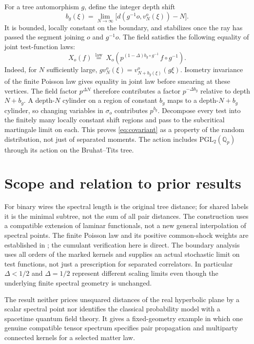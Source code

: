 \documentclass[11pt]{article}
\theoremstyle{remark}
\newcommand{\Qp}{\mathbb Q_p}
\begin{document}
For a tree automorphism \(g\), define the integer depth shift
\[
 b_g(\xi)=\lim_{N\to\infty}
   \bigl[d(g^{-1}o,v^o_N(\xi))-N\bigr] .
\]
It is bounded, locally constant on the boundary, and stabilizes once the ray has passed the segment joining \(o\) and \(g^{-1}o\). The field satisfies the following equality of joint test-function laws:
\begin{equation}\label{eq:covariant}
 X_o(f)\ \overset{\mathrm{law}}{=}\ 
 X_o\!\left(
     p^{(1-\Delta)b_g\circ g^{-1}}\, f\circ g^{-1}
      \right).
\end{equation}
Indeed, for \(N\) sufficiently large,
\(g v^o_N(\xi)=v^o_{N+b_g(\xi)}(g\xi)\).
Isometry invariance of the finite Poisson law gives equality in joint law before smearing at these vertices. The field factor \(p^{\Delta N}\) therefore contributes a factor \(p^{-\Delta b_g}\) relative to depth \(N+b_g\). A depth-\(N\) cylinder on a region of constant \(b_g\) maps to a depth-\(N+b_g\) cylinder, so changing variables in \(\sigma_o\) contributes \(p^{b_g}\). Decompose every test into the finitely many locally constant shift regions and pass to the subcritical martingale limit on each. This proves \eqref{eq:covariant} as a property of the random distribution, not just of separated moments. The action includes \(\mathrm{PGL}_2(\Qp)\) through its action on the Bruhat--Tits tree.

\section{Scope and relation to prior results}

For binary wires the spectral length is the original tree distance; for shared labels it is the minimal subtree, not the sum of all pair distances. The construction uses a compatible extension of laminar functionals, not a new general interpolation of spectral points. The finite Poisson law and its positive common-shock weights are established in \cite{Cote,Cossette}; the cumulant verification here is direct. The boundary analysis uses all orders of the marked kernels and supplies an actual stochastic limit on test functions, not just a prescription for separated correlators. In particular \(\Delta<1/2\) and \(\Delta=1/2\) represent different scaling limits even though the underlying finite spectral geometry is unchanged.

The result neither prices unsquared distances of the real hyperbolic plane by a scalar spectral point nor identifies the classical probability model with a spacetime quantum field theory. It gives a fixed-geometry example in which one genuine compatible tensor spectrum specifies pair propagation and multiparty connected kernels for a selected matter law.
\end{document}
